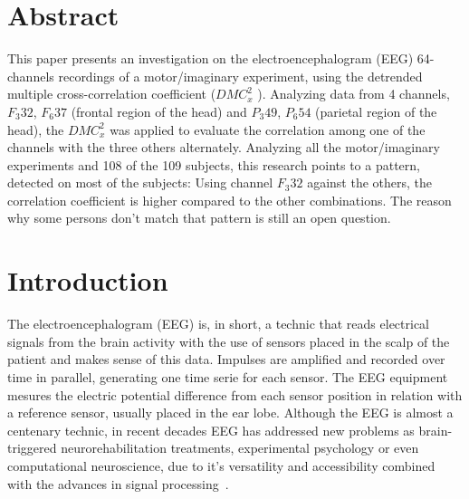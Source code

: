 \documentclass[10pt,letterpaper]{article}
\newcommand{\dmc}{\(DMC_x^2\) }
\begin{document}
\section*{Abstract}
This paper presents an investigation on the electroencephalogram (EEG) 64-channels recordings of a motor/imaginary experiment, using the detrended multiple cross-correlation coefficient (\dmc). Analyzing data from 4 channels, \(F_{3}32\), \(F_{6}37\) (frontal region of the head) and \(P_{3}49\), \(P_{6}54\) (parietal region of the head), the \dmc was applied to evaluate the correlation among one of the channels with the three others alternately. Analyzing all the motor/imaginary experiments and 108 of the 109 subjects, this research points to a pattern, detected on most of the subjects: Using channel \(F_{3}32\) against the others, the correlation coefficient is higher compared to the other combinations. The reason why some persons don't match that pattern is still an open question.


\linenumbers

\section*{Introduction}

The electroencephalogram (EEG) is, in short, a technic that reads electrical signals from the brain activity with the use of sensors placed in the scalp of the patient and makes sense of this data. Impulses are amplified and recorded over time in parallel, generating one time serie for each sensor. The EEG equipment mesures the electric potential difference from each sensor position in relation with a reference sensor, usually placed in the ear lobe. Although the EEG is almost a centenary technic, in recent decades EEG has addressed new problems as brain-triggered neurorehabilitation treatments, experimental psychology or even computational neuroscience, due to it's versatility and accessibility combined with the advances in signal processing~\cite{Biasiucci2019}.
\end{document}
